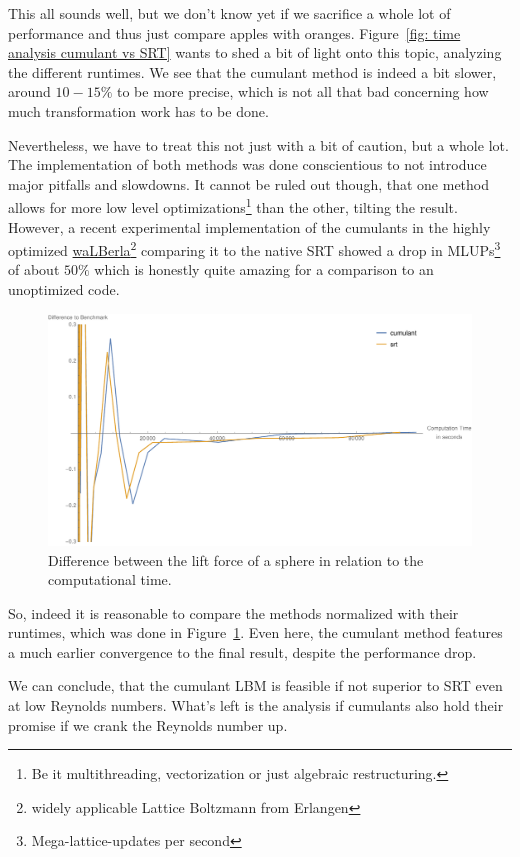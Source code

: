 This all sounds well, but we don't know yet if we sacrifice a whole lot of performance and thus just compare apples with oranges.
Figure~\ref{fig: time analysis cumulant vs SRT} wants to shed a bit of light onto this topic, analyzing the different runtimes.
We see that the cumulant method is indeed a bit slower, around $10-15\%$ to be more precise, which is not all that bad concerning how much transformation work has to be done.

Nevertheless, we have to treat this not just with a bit of caution, but a whole lot.
The implementation of both methods was done conscientious to not introduce major pitfalls and slowdowns.
It cannot be ruled out though, that one method allows for more low level optimizations\footnote{Be it multithreading, vectorization or just algebraic restructuring.} than the other, tilting the result.
However, a recent experimental implementation of the cumulants in the highly optimized \href{http://walberla.net/index.html}{waLBerla}\footnote{widely applicable Lattice Boltzmann from Erlangen} comparing it to the native SRT showed a drop in MLUPs\footnote{Mega-lattice-updates per second} of about $50\%$ which is honestly quite amazing for a comparison to an unoptimized code.

\begin{figure}
  \centering
  \includegraphics[width=\linewidth]{../figures/schaeferTurekLift_timeDifference.pdf} %
  \caption{Difference between the lift force of a sphere in relation to the computational time.}
\label{fig: schaefer turek time difference}
\end{figure}

So, indeed it is reasonable to compare the methods normalized with their runtimes, which was done in Figure~\ref{fig: schaefer turek time difference}.
Even here, the cumulant method features a much earlier convergence to the final result, despite the performance drop.


We can conclude, that the cumulant LBM is feasible if not superior to SRT even at low Reynolds numbers.
What's left is the analysis if cumulants also hold their promise if we crank the Reynolds number up.
